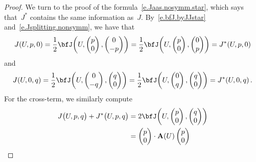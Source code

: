 \documentclass[11pt,twoside]{article} %
\numberwithin{equation}{section}
\theoremstyle{definition}
\newcommand{\bfA}{\mathbf{A}}
\begin{document}
\begin{proof}
We turn to the proof of the formula~\eqref{e.Jaas.nosymm.star}, which says that~$J^*$ contains the same information as~$J$. 
By~\eqref{e.bfJ.byJJstar} and~\eqref{e.Jsplitting.nonsymm}, we have that 
\begin{equation*}
J(U,p,0) = 
\frac12 \bfJ
\biggl(U, \begin{pmatrix} p  \\ 0 \end{pmatrix}, \begin{pmatrix} 0 \\ -p \end{pmatrix} \biggr)
=
\frac12 \bfJ
\biggl(U, \begin{pmatrix} p  \\ 0 \end{pmatrix}, \begin{pmatrix} 0 \\ p \end{pmatrix} \biggr)
=
J^*(U,p,0) 
\end{equation*}
and
\begin{equation*}
J(U,0,q) = 
\frac12 \bfJ
\biggl(U, \begin{pmatrix} 0  \\ -q \end{pmatrix}, \begin{pmatrix} q \\ 0 \end{pmatrix} \biggr)
=
\frac12 \bfJ
\biggl(U, \begin{pmatrix} 0  \\ q \end{pmatrix}, \begin{pmatrix} q \\ 0 \end{pmatrix} \biggr)
=
J^*(U,0,q) 
\,.
\end{equation*}
For the cross-term, we similarly compute
\begin{align*}
J\bigl(U,p,q\bigr)
+ 
J^*\bigl(U, p ,q\bigr)
&
=
2\bfJ
\biggl(U, \begin{pmatrix} p  \\ 0 \end{pmatrix}, \begin{pmatrix} q \\ 0 \end{pmatrix} \biggr)
\\ & 
=
\begin{pmatrix} p  \\ 0 \end{pmatrix} \cdot \bfA(U) \begin{pmatrix} p  \\ 0 \end{pmatrix}

\end{align*}
\end{proof}
\end{document}
